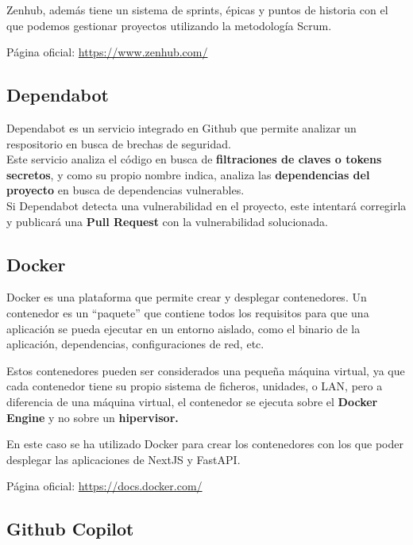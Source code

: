 Zenhub, además tiene un sistema de sprints, épicas y puntos de historia
con el que podemos gestionar proyectos utilizando la metodología Scrum.

Página oficial: \href{https://www.zenhub.com/}{https://www.zenhub.com/}

\hypertarget{dependabot}{%
\subsection{\texorpdfstring{Dependabot
}{Dependabot }}\label{dependabot}}

Dependabot es un servicio integrado en Github que permite analizar un
respositorio en busca de brechas de seguridad.\\
Este servicio analiza el código en busca de \textbf{filtraciones de
claves o tokens secretos}, y como su propio nombre indica, analiza las
\textbf{dependencias del proyecto} en busca de dependencias vulnerables.\\
Si Dependabot detecta una vulnerabilidad en el proyecto, este intentará
corregirla y publicará una \textbf{Pull Request} con la vulnerabilidad
solucionada.

\hypertarget{docker}{%
\subsection{Docker}\label{docker}}

Docker es una plataforma que permite crear y desplegar contenedores. Un
contenedor es un ``paquete'' que contiene todos los requisitos para que
una aplicación se pueda ejecutar en un entorno aislado, como el binario
de la aplicación, dependencias, configuraciones de red, etc.

Estos contenedores pueden ser considerados una pequeña máquina virtual,
ya que cada contenedor tiene su propio sistema de ficheros, unidades, o
LAN, pero a diferencia de una máquina virtual, el contenedor se ejecuta
sobre el \textbf{Docker Engine} y no sobre un \textbf{hipervisor.}

En este caso se ha utilizado Docker para crear los contenedores con los
que poder desplegar las aplicaciones de NextJS y FastAPI.

Página oficial: \href{https://docs.docker.com/}{https://docs.docker.com/}

\hypertarget{github-copilot}{%
\subsection{Github Copilot}\label{github-copilot}}

